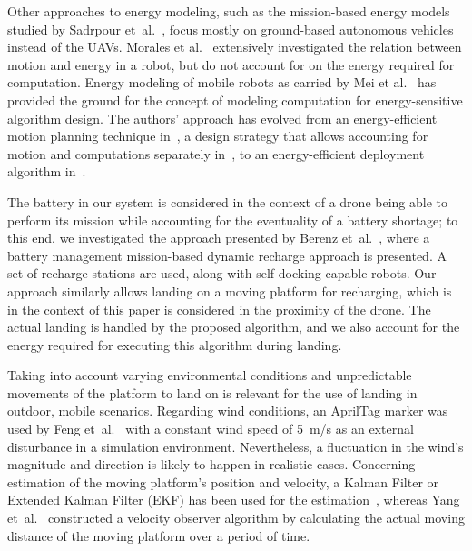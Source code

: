 \documentclass[conference]{IEEEtran}
\begin{document}
Other approaches to energy modeling, such as the mission-based energy models studied by Sadrpour et~al.~\cite{sadrpour2013experimental, sadrpour2013mission}, focus mostly on ground-based autonomous vehicles instead of the UAVs. Morales et al.~\cite{morales2009power} extensively investigated the relation between motion and energy in a robot, but do not account for on the energy required for computation.
%
Energy modeling of mobile robots as carried by Mei et al.~\cite{mei2006deployment, mei2005case, mei2004energy} has provided the ground for the concept of modeling computation for energy-sensitive algorithm design. The authors' approach has evolved from an energy-efficient motion planning technique in~\cite{mei2004energy}, a design strategy that allows accounting for motion and computations separately in~\cite{mei2005case}, to an energy-efficient deployment algorithm in~\cite{mei2006deployment}.

The battery in our system is considered in the context of a drone being able to perform its mission while accounting for the eventuality of a battery shortage; to this end, we investigated the approach presented by Berenz et~al.~\cite{berenz2012autonomous}, where a battery management mission-based dynamic recharge approach is presented. A set of recharge stations are used, along with self-docking capable robots. Our approach similarly allows landing on a moving platform for recharging, which is in the context of this paper is considered in the proximity of the drone. The actual landing is handled by the proposed algorithm, and we also account for the energy required for executing this algorithm during landing.

Taking into account varying environmental conditions and unpredictable movements of the platform to land on is relevant for the use of landing in outdoor, mobile scenarios.
Regarding wind conditions, an AprilTag marker was used by Feng et~al.~\cite{feng2018autonomous} with a constant wind speed of 5~m/s as an external disturbance in a simulation environment. Nevertheless, a fluctuation in the wind's magnitude and direction is likely to happen in realistic cases.
Concerning estimation of the moving platform's position and velocity, a Kalman Filter or Extended Kalman Filter (EKF) has been used for the estimation~\cite{araar2017vision,feng2018autonomous, falanga2017vision}, whereas Yang et~al.~\cite{yang2018hybrid} constructed a velocity observer algorithm by calculating the actual moving distance of the moving platform over a period of time. 
\end{document}

